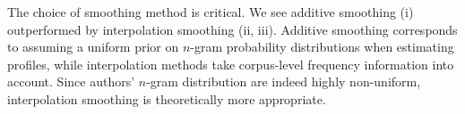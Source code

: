 \documentclass[twocolumn,10pt]{article}
\begin{document}
The choice of smoothing method is critical.
We see additive smoothing (i) outperformed by interpolation
smoothing (ii, iii).
Additive smoothing corresponds to assuming a uniform prior
on $n$-gram probability distributions when estimating profiles,
while interpolation methods take corpus-level frequency
information into account.
Since authors' $n$-gram distribution are indeed highly
non-uniform, interpolation smoothing is theoretically
more appropriate. %


\printbibliography
\end{document}
